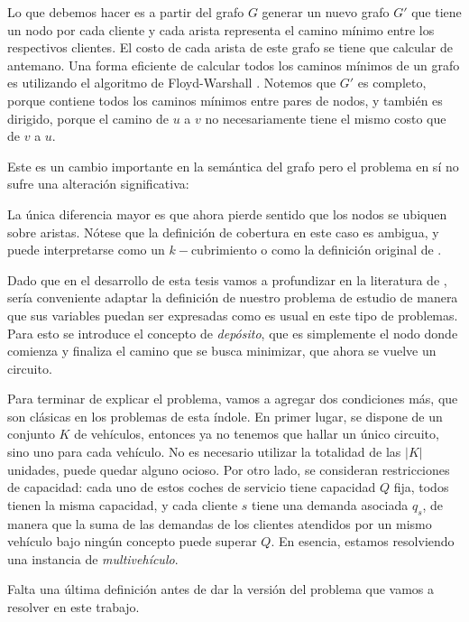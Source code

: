 Lo que debemos hacer es a partir del grafo $G$ generar un nuevo grafo $G'$ que tiene un nodo por cada cliente y cada arista representa el camino mínimo entre los respectivos clientes. El costo de cada arista de este grafo se tiene que calcular de antemano. Una forma eficiente de calcular todos los caminos mínimos de un grafo es utilizando el algoritmo de Floyd-Warshall \cite{cormen}. Notemos que $G'$ es completo, porque contiene todos los caminos mínimos entre pares de nodos, y también es dirigido, porque el camino de $u$ a $v$ no necesariamente tiene el mismo costo que de $v$ a $u$.

Este es un cambio importante en la semántica del grafo pero el problema en sí no sufre una alteración significativa:


La única diferencia mayor es que ahora pierde sentido que los nodos se ubiquen sobre aristas. Nótese que la definición de cobertura en este caso es ambigua, y puede interpretarse como un $k-$cubrimiento o como la definición original de .

Dado que en el desarrollo de esta tesis vamos a profundizar en la literatura de , sería conveniente adaptar la definición de nuestro problema de estudio de manera que sus variables puedan ser expresadas como es usual en este tipo de problemas. Para esto se introduce el concepto de \emph{depósito}, que es simplemente el nodo donde comienza y finaliza el camino que se busca minimizar, que ahora se vuelve un circuito. 

Para terminar de explicar el problema, vamos a agregar dos condiciones más, que son clásicas en los problemas de esta índole. En primer lugar, se dispone de un conjunto $K$ de vehículos, entonces ya no tenemos que hallar un único circuito, sino uno para cada vehículo. No es necesario utilizar la totalidad de las $|K|$ unidades, puede quedar alguno ocioso. Por otro lado, se consideran restricciones de capacidad: cada uno de estos coches de servicio tiene capacidad $Q$ fija, todos tienen la misma capacidad, y cada cliente $s$ tiene una demanda asociada $q_s$, de manera que la suma de las demandas de los clientes atendidos por un mismo vehículo bajo ningún concepto puede superar $Q$. En esencia, estamos resolviendo una instancia de  \emph{multivehículo}.

Falta una última definición antes de dar la versión del problema que vamos a resolver en este trabajo. 

